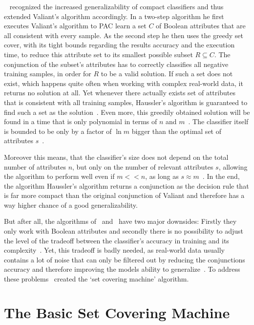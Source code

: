 ~\cite{haussler88} recognized the increased generalizability of compact classifiers and thus extended Valiant's algorithm accordingly.
In a two-step algorithm he first executes Valiant's algorithm to PAC learn a set \(C\) of Boolean attributes
that are all consistent with every sample.
As the second step he then uses the greedy set cover, with its tight bounds regarding the results accuracy and the execution time,
to reduce this attribute set to its smallest possible subset \(R \subseteq C\).
The conjunction of the subset's attributes has to correctly classifies all negative training samples, in order for \(R\) to be a valid solution.
If such a set does not exist, which happens quite often when working with complex real-world data, it returns no solution at all.
Yet whenever there actually exists set of attributes that is consistent with all training samples, 
Haussler's algorithm is guaranteed to find such a set as the solution~\citep{marchand02}.
Even more, this greedily obtained solution will be found in a time that is only polynomial in terms of \(n\) and \(m\)~\citep{kestler06}.
The classifier itself is bounded to be only by a factor of \(\ln m\) bigger than the optimal set of attributes \(s\)~\citep{marchand04,kestler06}.

Moreover this means, that the classifier's size does not depend on the total number of attributes \(n\), but only on the
number of relevant attributes \(s\), allowing the algorithm to perform well even if \(m << n\), as long as \(s \approx m\)~\citep{kestler06}.
In the end, the algorithm Haussler's algorithm returns a conjunction as the decision rule that is far more compact
than the original conjunction of Valiant and therefore has a way higher chance of a good generalizability.

But after all, the algorithms of~\cite{valiant} and~\cite{haussler88} have two major downsides:
Firstly they only work with Boolean attributes and secondly there is no possibility to adjust the level of the tradeoff
between the classifier's accuracy in training and its complexity~\citep{marchand02}.
Yet, this tradeoff is badly needed, as real-world data usually contains a lot of noise that can only be
filtered out by reducing the conjunctions accuracy and therefore improving the models ability to generalize~\citep{marchand02}.
To address these problems~\cite{marchand02} created the `set covering machine' algorithm.

\section{The Basic Set Covering Machine}\label{sec:basicSCM}

